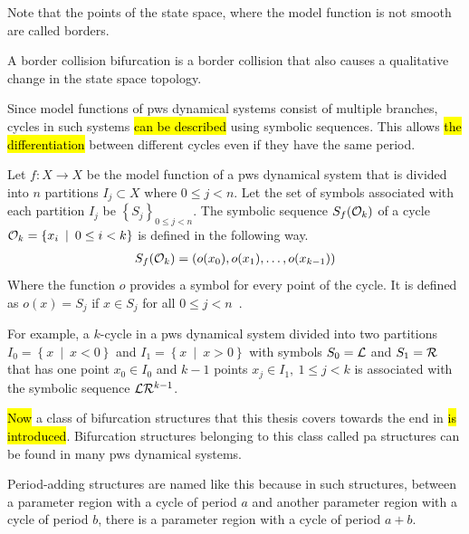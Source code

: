 Note that the points of the state space, where the model function is not smooth are called borders.

\begin{definition}
	A border collision bifurcation is a border collision that also causes a qualitative change in the state space topology.
\end{definition}

Since model functions of \gls{pws} dynamical systems consist of multiple branches, cycles in such systems \hl{can be described} using symbolic sequences.
This allows \hl{the differentiation} between different cycles even if they have the same period.

\begin{definition}
	Let $f: X \to X$ be the model function of a \gls{pws} dynamical system that is divided into $n$ partitions $I_j \subset X$ where $0 \leq j < n$.
	Let the set of symbols associated with each partition $I_j$ be $\left\{S_j\right\}_{0 \leq j < n}$.
	The symbolic sequence $S_f(\mathcal{O}_k)$ of a cycle $\mathcal{O}_k = \left\{x_i \:\mid\: 0 \leq i < k\right\}$ is defined in the following way.
	\begin{align}
		S_f(\mathcal{O}_k) = \left(o(x_0), o(x_1), \dots, o(x_{k-1})\right)
	\end{align}
	Where the function $o$ provides a symbol for every point of the cycle.
	It is defined as $o(x) = S_j$ if $x \in S_j$ for all $0 \leq j < n$~\cite{granados14adding}.
\end{definition}

For example, a $k$-cycle in a \gls{pws} dynamical system divided into two partitions $I_0 = \left\{x \:\mid\: x < 0\right\}$ and $I_1 = \left\{x \:\mid\: x > 0\right\}$ with symbols $S_0 = \mathcal{L}$ and $S_1 = \mathcal{R}$ that has one point $x_0 \in I_0$ and $k-1$ points $x_j \in I_1, \:1 \leq j < k$ is associated with the symbolic sequence $\mathcal{L}\mathcal{R}^{k-1}$.

\hl{Now} a class of bifurcation structures that this thesis covers towards the end in  \hl{is introduced}.
Bifurcation structures belonging to this class called \gls{pa} structures can be found in many \gls{pws} dynamical systems.

Period-adding structures are named like this because in such structures, between a parameter region with a cycle of period $a$ and another parameter region with a cycle of period $b$, there is a parameter region with a cycle of period $a + b$.

